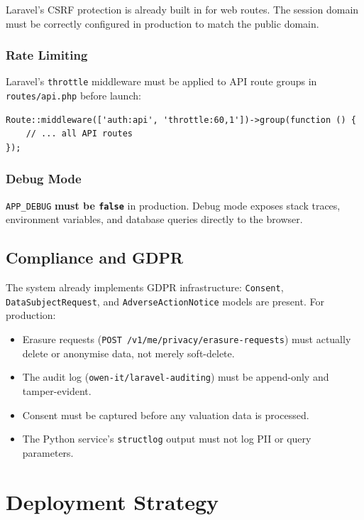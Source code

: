 \documentclass[12pt,a4paper]{report}
\begin{document}
Laravel's CSRF protection is already built in for web routes.
The session domain must be correctly configured in production to match
the public domain.

\subsection{Rate Limiting}

Laravel's \texttt{throttle} middleware must be applied to API route
groups in \texttt{routes/api.php} before launch:

\begin{lstlisting}[caption={API rate limiting (routes/api.php)}]
Route::middleware(['auth:api', 'throttle:60,1'])->group(function () {
    // ... all API routes
});
\end{lstlisting}

\subsection{Debug Mode}

\texttt{APP\_DEBUG} \textbf{must be \texttt{false}} in production.
Debug mode exposes stack traces, environment variables, and database
queries directly to the browser.

\section{Compliance and GDPR}

The system already implements GDPR infrastructure:
\texttt{Consent}, \texttt{DataSubjectRequest}, and
\texttt{AdverseActionNotice} models are present. For production:

\begin{itemize}[leftmargin=1.5em]
    \item Erasure requests (\texttt{POST /v1/me/privacy/erasure-requests})
          must actually delete or anonymise data, not merely soft-delete.
    \item The audit log (\texttt{owen-it/laravel-auditing}) must be
          append-only and tamper-evident.
    \item Consent must be captured before any valuation data is
          processed.
    \item The Python service's \texttt{structlog} output must not log
          PII or query parameters.
\end{itemize}

\chapter{Deployment Strategy}
\label{ch:deployment}
\end{document}
